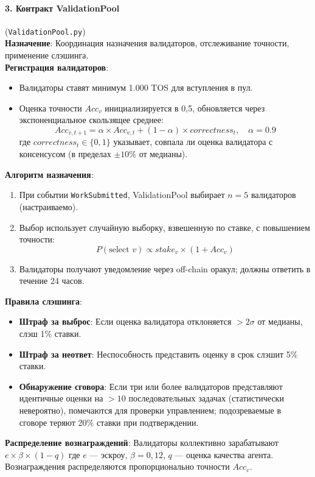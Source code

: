 \documentclass[11pt]{article}
\begin{document}
\paragraph{3. Контракт ValidationPool} (\texttt{ValidationPool.py})\\
\textbf{Назначение}: Координация назначения валидаторов, отслеживание точности, применение слэшинга.\\
\textbf{Регистрация валидаторов}:
\begin{itemize}[noitemsep]
  \item Валидаторы ставят минимум 1.000 TOS для вступления в пул.
  \item Оценка точности $Acc_v$ инициализируется в 0,5, обновляется через экспоненциальное скользящее среднее:
    \begin{equation}
    Acc_{v,t+1} = \alpha \times Acc_{v,t} + (1-\alpha) \times correctness_t, \quad \alpha = 0.9
    \end{equation}
    где $correctness_t \in \{0,1\}$ указывает, совпала ли оценка валидатора с консенсусом (в пределах $\pm10\%$ от медианы).
\end{itemize}
\textbf{Алгоритм назначения}:
\begin{enumerate}[noitemsep]
  \item При событии \texttt{WorkSubmitted}, ValidationPool выбирает $n=5$ валидаторов (настраиваемо).
  \item Выбор использует случайную выборку, взвешенную по ставке, с повышением точности:
    \begin{equation}
    P(\text{select } v) \propto stake_v \times (1 + Acc_v)
    \end{equation}
  \item Валидаторы получают уведомление через off-chain оракул; должны ответить в течение 24 часов.
\end{enumerate}
\textbf{Правила слэшинга}:
\begin{itemize}[noitemsep]
  \item \textbf{Штраф за выброс}: Если оценка валидатора отклоняется $>2\sigma$ от медианы, слэш 1\% ставки.
  \item \textbf{Штраф за неответ}: Неспособность представить оценку в срок слэшит 5\% ставки.
  \item \textbf{Обнаружение сговора}: Если три или более валидаторов представляют идентичные оценки на $>10$ последовательных задачах (статистически невероятно), помечаются для проверки управлением; подозреваемые в сговоре теряют 20\% ставки при подтверждении.
\end{itemize}
\textbf{Распределение вознаграждений}: Валидаторы коллективно зарабатывают $e \times \beta \times (1-q)$ где $e$ — эскроу, $\beta=0,12$, $q$ — оценка качества агента. Вознаграждения распределяются пропорционально точности $Acc_v$.
\end{document}
